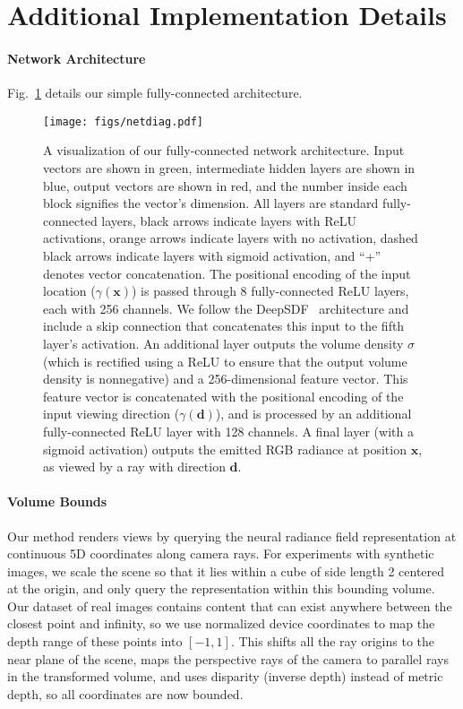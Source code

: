 \documentclass[runningheads]{llncs}
\begin{document}



\appendix

\section{Additional Implementation Details}

\paragraph{\textbf{Network Architecture}}  
Fig.~\ref{fig:net} details our simple fully-connected architecture.


\begin{figure}[t]
\centering
\texttt{[image: figs/netdiag.pdf]}
\caption{A visualization of our fully-connected network architecture. Input vectors are shown in green, intermediate hidden layers are shown in blue, output vectors are shown in red, and the number inside each block signifies the vector's dimension. All layers are standard fully-connected layers, black arrows indicate layers with ReLU activations, orange arrows indicate layers with no activation, dashed black arrows indicate layers with sigmoid activation, and ``+'' denotes vector concatenation. The positional encoding of the input location ($\gamma(\mathbf{x})$) is passed through 8 fully-connected ReLU layers, each with 256 channels. We follow the DeepSDF~\cite{deepsdf} architecture and include a skip connection that concatenates this input to the fifth layer's activation. An additional layer outputs the volume density $\sigma$ (which is rectified using a ReLU to ensure that the output volume density is nonnegative) and a 256-dimensional feature vector. This feature vector is concatenated with the positional encoding of the input viewing direction ($\gamma(\mathbf{d})$), and is processed by an additional fully-connected ReLU layer with 128 channels. A final layer (with a sigmoid activation) outputs the emitted RGB radiance at position $\mathbf{x}$, as viewed by a ray with direction $\mathbf{d}$.}
\label{fig:net}
\end{figure}


\paragraph{\textbf{Volume Bounds}}
Our method renders views by querying the neural radiance field representation at continuous 5D coordinates along camera rays. For experiments with synthetic images, we scale the scene so that it lies within a cube of side length 2 centered at the origin, and only query the representation within this bounding volume. Our dataset of real images contains content that can exist anywhere between the closest point and infinity, so we use normalized device coordinates to map the depth range of these points into $[-1,1]$. This shifts all the ray origins to the near plane of the scene, maps the perspective rays of the camera to parallel rays in the transformed volume, and uses disparity (inverse depth) instead of metric depth, so all coordinates are now bounded.
\end{document}
